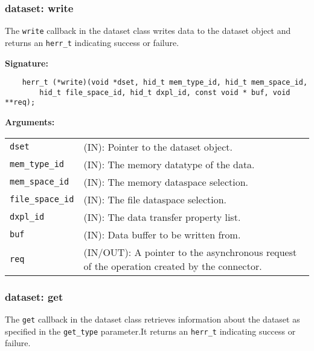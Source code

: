 \subsubsection{dataset: write}
The \texttt{write} callback in the dataset class writes data to
the dataset object and returns an \texttt{herr\_t} indicating success or
failure.\bigskip

\begin{mdframed}[style=bgbox]
\textbf{Signature:}
\begin{lstlisting}
    herr_t (*write)(void *dset, hid_t mem_type_id, hid_t mem_space_id, 
        hid_t file_space_id, hid_t dxpl_id, const void * buf, void **req);
\end{lstlisting}

\textbf{Arguments:}\\
\begin{tabular}{l p{13.5cm}}
  \texttt{dset} & (IN): Pointer to the dataset object.\\
  \texttt{mem\_type\_id} & (IN): The memory datatype of the data.\\
  \texttt{mem\_space\_id} & (IN): The memory dataspace selection.\\
  \texttt{file\_space\_id} & (IN): The file dataspace selection.\\
  \texttt{dxpl\_id} & (IN): The data transfer property list.\\
  \texttt{buf} & (IN): Data buffer to be written from.\\
  \texttt{req} & (IN/OUT): A pointer to the asynchronous request of the
  operation created by the connector.\\
\end{tabular}
\end{mdframed}

\subsubsection{dataset: get}
The \texttt{get} callback in the dataset class retrieves
information about the dataset as specified in the \texttt{get\_type}
parameter.It returns an \texttt{herr\_t} indicating success or failure.\bigskip

